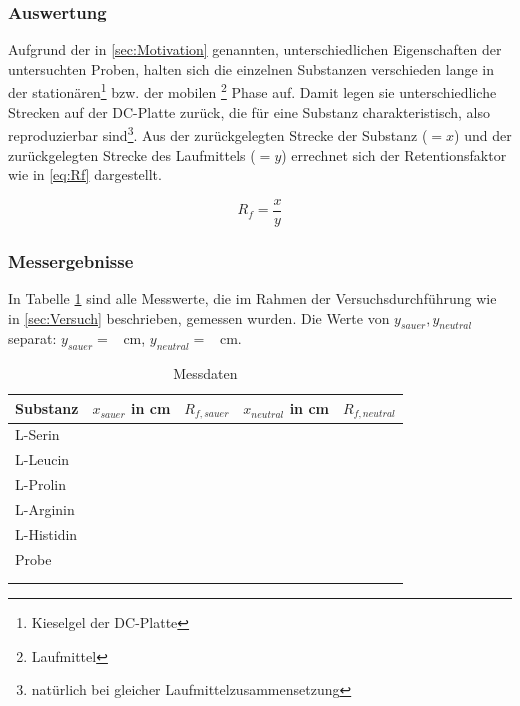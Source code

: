 \documentclass{article}
\begin{document}
      \subsubsection{Auswertung}
    
        Aufgrund der in \ref{sec:Motivation} genannten, unterschiedlichen Eigenschaften der untersuchten Proben, halten sich die einzelnen Substanzen verschieden lange in der stationären\footnote{Kieselgel der DC-Platte} bzw. der mobilen \footnote{Laufmittel} Phase auf. Damit legen sie unterschiedliche Strecken auf der DC-Platte zurück, die für eine  Substanz charakteristisch, also reproduzierbar sind\footnote{natürlich bei gleicher Laufmittelzusammensetzung}. Aus der zurückgelegten Strecke der Substanz ($= x$) und der zurückgelegten Strecke des Laufmittels ($= y$) errechnet sich der Retentionsfaktor wie in \eqref{eq:Rf} dargestellt.
    
        \begin{equation}
          R_{f} = \frac{x}{y} \label{eq:Rf}
        \end{equation}
      
      \subsubsection{Messergebnisse}
    
        In Tabelle \ref{tab:Messdaten} sind alle Messwerte, die im Rahmen der Versuchsdurchführung wie in \ref{sec:Versuch} beschrieben, gemessen wurden. Die Werte von $y_{sauer}, y_{neutral}$ separat: $y_{sauer} = $ \SI[mode=text]{}{\centi\meter}, $y_{neutral} = $ \SI[mode=text]{}{\centi\meter}.
      
        \begin{table}[H]
          \centering
          \caption[Messdaten, Quelle: Autor]{Messdaten}
          \label{tab:Messdaten}
            \begin{tabular}{@{}l|ll|ll@{}}
              \toprule
               Substanz & $x_{sauer}$ in \si{\centi\meter} & $R_{f,sauer}$ & $x_{neutral}$ in \si{\centi\meter} & $R_{f,neutral}$ \\ \midrule
               L-Serin &  & & \\
               L-Leucin &  &  &  \\
               L-Prolin &  &  &  \\
               L-Arginin &  &  &  \\
               L-Histidin &  &  &  \\ \midrule
               Probe &  &  &  \\
                     &  &  &  \\
                     &  &  &  \\ \bottomrule
            \end{tabular}
         \end{table}      
      
\end{document}
